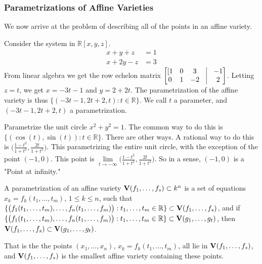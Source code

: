 \documentclass[../main.tex]{subfiles}
\begin{document}
\subsubsection{Parametrizations of Affine Varieties}
%
We now arrive at the problem of describing all of the points in an affine variety. 

\begin{example}
Consider the system in $\mathbb{R}[x,y,z]$.
\begin{align*}
\nonumber x+y+z &= 1 \\
\nonumber x+2y-z &= 3
\end{align*}
From linear algebra we get the row echelon matrix $\begin{bmatrix}[1 & 0 & 3 & \vline & -1 \\ 0 & 1 & -2 & \vline & 2 \end{bmatrix}$. Letting $z=t$, we get $x = -3t-1$ and $y = 2+2t$. The parametrization of the affine variety is thus $\{(-3t-1,2t+2,t):t\in \mathbb{R}\}$. We call $t$ a parameter, and $(-3t-1,2t+2,t)$ a parametrization.
\end{example}

\begin{example}
Parametrize the unit circle $x^2+y^2=1$. The common way to do this is $\{(\cos(t),\sin(t)):t\in \mathbb{R}\}$. There are other ways. A rational way to do this is $\big(\frac{1-t^2}{1+t^2}, \frac{2t}{1+t^2}\big)$. This parametrizing the entire unit circle, with the exception of the point $(-1,0)$. This point is $\underset{t\rightarrow -\infty} \lim \big(\frac{1-t^2}{1+t^2},\frac{2t}{1+t^2}\big)$. So in a sense, $(-1,0)$ is a "Point at infinity."
\end{example}

\begin{definition}
A parametrization of an affine variety $\textbf{V}(f_1,\hdots, f_s) \subset k^n$ is a set of equations $x_k = f_k(t_1,\hdots, t_m)$, $1\leq k \leq n$, such that $ \{\big(f_1(t_1,\hdots, t_m),\hdots, f_n(t_1,\hdots, f_m)\big): t_1,\hdots, t_m \in \mathbb{R}\}\subset \textbf{V}(f_1,\hdots, f_s)$, and if $\{\big(f_1(t_1,\hdots, t_m),\hdots, f_n(t_1,\hdots, f_m)\big): t_1,\hdots, t_m \in \mathbb{R}\}\subset \textbf{V}(g_1,\hdots, g_t)$, then $\textbf{V}(f_1,\hdots, f_s) \subset \textbf{V}(g_1,\hdots, g_t)$.
\end{definition}

\begin{remark}
That is the the points $(x_1,\hdots, x_n)$, $x_k = f_k(t_1,\hdots, t_m)$, all lie in $\textbf{V}(f_1,\hdots, f_s)$, and $\textbf{V}(f_1,\hdots, f_s)$ is the smallest affine variety containing these points.
\end{remark}
\end{document}
